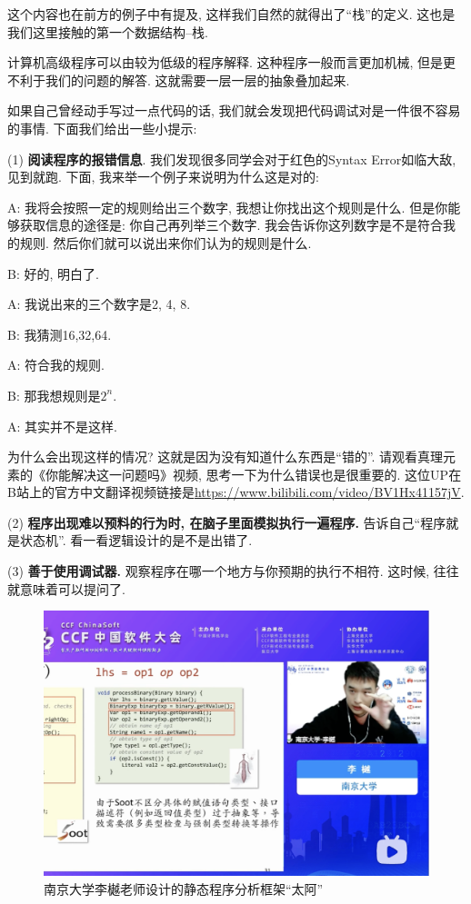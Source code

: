 这个内容也在前方的例子中有提及, 这样我们自然的就得出了``栈''的定义. 这也是我们这里接触的第一个数据结构--栈.

\begin{idea}
	计算机高级程序可以由较为低级的程序解释. 这种程序一般而言更加机械, 但是更不利于我们的问题的解答. 这就需要一层一层的抽象叠加起来. 
\end{idea}  

如果自己曾经动手写过一点代码的话, 我们就会发现把代码调试对是一件很不容易的事情. 下面我们给出一些小提示: 

(1) \textbf{阅读程序的报错信息}. 我们发现很多同学会对于红色的Syntax Error如临大敌, 见到就跑. 下面, 我来举一个例子来说明为什么这是对的: 

\begin{dialogue}
	A: 我将会按照一定的规则给出三个数字, 我想让你找出这个规则是什么. 但是你能够获取信息的途径是: 你自己再列举三个数字. 我会告诉你这列数字是不是符合我的规则. 然后你们就可以说出来你们认为的规则是什么. 
	
	B: 好的, 明白了. 
	
	A: 我说出来的三个数字是2, 4, 8. 
	
	B: 我猜测16,32,64.
	
	A: 符合我的规则.
	
	B: 那我想规则是$2^n$. 
	
	A: 其实并不是这样. 
\end{dialogue}

为什么会出现这样的情况? 这就是因为没有知道什么东西是``错的''. 请观看真理元素的《你能解决这一问题吗》视频, 思考一下为什么错误也是很重要的. 这位UP在B站上的官方中文翻译视频链接是\url{https://www.bilibili.com/video/BV1Hx41157jV}. 

(2) \textbf{程序出现难以预料的行为时, 在脑子里面模拟执行一遍程序.} 告诉自己``程序就是状态机''. 看一看逻辑设计的是不是出错了. 

(3) \textbf{善于使用调试器.} 观察程序在哪一个地方与你预期的执行不相符. 这时候, 往往就意味着可以提问了. 

\begin{figure}[!htbp]
	\centering
	\includegraphics[scale=0.4]{1-python-plim/figs/yueli.png}
	\caption{南京大学李樾老师设计的静态程序分析框架“太阿”}
	\label{fig:ly}
	
\end{figure}


